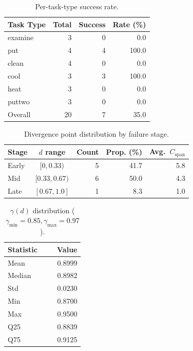 \begin{table}[t]
\centering
\caption{Per-task-type success rate.}
\label{tab:task_type_sr}
\begin{tabular}{lrrr}
\toprule
Task Type & Total & Success & Rate (\%) \\
\midrule
examine & 3 & 0 & 0.0 \\
put & 4 & 4 & 100.0 \\
clean & 4 & 0 & 0.0 \\
cool & 3 & 3 & 100.0 \\
heat & 3 & 0 & 0.0 \\
puttwo & 3 & 0 & 0.0 \\
\midrule
Overall & 20 & 7 & 35.0 \\
\bottomrule
\end{tabular}
\end{table}

\begin{table}[t]
\centering
\caption{Divergence point distribution by failure stage.}
\label{tab:divergence_groups}
\begin{tabular}{lcrrr}
\toprule
Stage & $d$ range & Count & Prop. (\%) & Avg.\ $C_{\text{span}}$ \\
\midrule
Early & $[0, 0.33)$ & 5 & 41.7 & 5.8 \\
Mid & $[0.33, 0.67)$ & 6 & 50.0 & 4.3 \\
Late & $[0.67, 1.0]$ & 1 & 8.3 & 1.0 \\
\bottomrule
\end{tabular}
\end{table}

\begin{table}[t]
\centering
\caption{$\gamma(d)$ distribution ($\gamma_{\min}=0.85, \gamma_{\max}=0.97$).}
\label{tab:gamma_dist}
\begin{tabular}{lr}
\toprule
Statistic & Value \\
\midrule
Mean & 0.8999 \\
Median & 0.8982 \\
Std & 0.0230 \\
Min & 0.8700 \\
Max & 0.9500 \\
Q25 & 0.8839 \\
Q75 & 0.9125 \\
\bottomrule
\end{tabular}
\end{table}